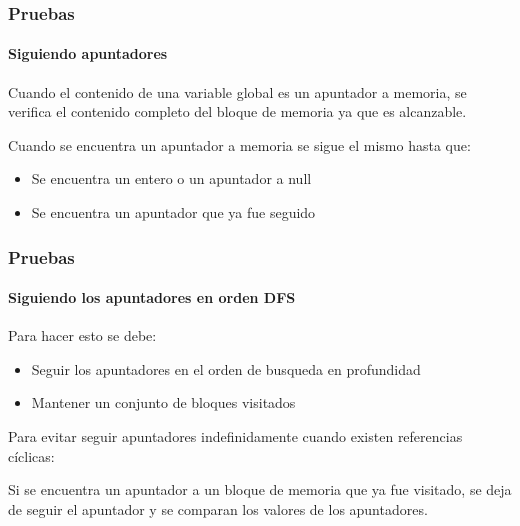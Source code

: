 \begin{frame}
\frametitle{Pruebas}
\framesubtitle{Siguiendo apuntadores}

Cuando el contenido de una variable global es un apuntador a memoria, se verifica el contenido completo del bloque de memoria ya que es alcanzable.
\bigskip
\pause

Cuando se encuentra un apuntador a memoria se sigue el mismo hasta que:
\begin{itemize}
\item{Se encuentra un entero o un apuntador a null}
\item{Se encuentra un apuntador que ya fue seguido}
\end{itemize}
\bigskip

\end{frame}


\begin{frame}
\frametitle{Pruebas}
\framesubtitle{Siguiendo los apuntadores en orden DFS}

Para hacer esto se debe:
\begin{itemize}
\item{Seguir los apuntadores en el orden de busqueda en profundidad}
\item{Mantener un conjunto de bloques visitados}
\end{itemize}


Para evitar seguir apuntadores indefinidamente cuando existen referencias cíclicas:

Si se encuentra un apuntador a un bloque de memoria que ya fue visitado, se deja de seguir el apuntador y se comparan los valores de los apuntadores.

\end{frame}


\begin{comment}
\begin{frame}
\frametitle{Pruebas}
\framesubtitle{Automatización del proceso de pruebas}

Para automatizar el proceso de pruebas se definieron dos ambientes de pruebas (uno en Isabelle y otro en C) que ayudaran en el proceso de generación y corrida de pruebas.
\bigskip
\pause

Además de la generación de pruebas se necesita una manera de ejecutar todas las pruebas en la batería.
\pause
\bigskip

\begin{itemize}
\item{Se define un archivo en Isabelle que importa cada prueba en la batería.}
\item{Se define un Makefile y un shell script que automatizará el proceso de compilación y corrida del código generado.}
\end{itemize}

\end{frame}
\end{comment}

